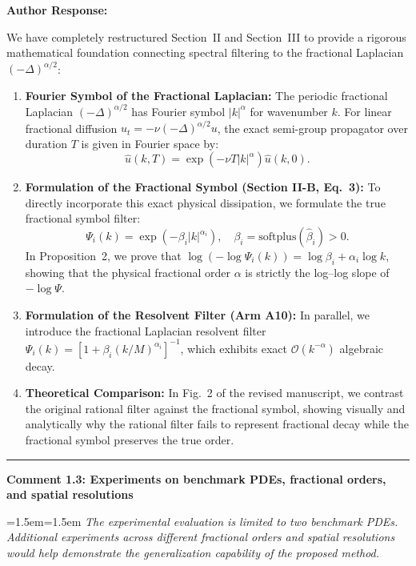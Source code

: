 \documentclass[11pt,a4paper]{article}
\newcommand{\revcomment}[2]{%
  \vspace{3mm}\par\noindent
  \textbf{\color{navyblue}#1}\par\vspace{1.5mm}
  \begingroup
  \leftskip=1.5em\rightskip=1.5em
  \small\itshape\color{commentgray}
  #2\par
  \endgroup
  \vspace{2mm}
}
\newenvironment{authorresponse}{%
  \vspace{1mm}\par\noindent
  \textbf{\color{navyblue}Author Response:}\par\vspace{1.5mm}
}{%
  \vspace{3mm}\par\noindent\rule{\textwidth}{0.3pt}\vspace{2mm}
}
\begin{document}
\begin{authorresponse}
We have completely restructured Section~II and Section~III to provide a rigorous mathematical foundation connecting spectral filtering to the fractional Laplacian $(-\Delta)^{\alpha/2}$:

\begin{enumerate}
  \item \textbf{Fourier Symbol of the Fractional Laplacian:} The periodic fractional Laplacian $(-\Delta)^{\alpha/2}$ has Fourier symbol $|k|^\alpha$ for wavenumber $k$. For linear fractional diffusion $u_t = -\nu (-\Delta)^{\alpha/2} u$, the exact semi-group propagator over duration $T$ is given in Fourier space by:
  \begin{equation}
    \hat{u}(k, T) = \exp(-\nu T |k|^\alpha) \hat{u}(k, 0).
  \end{equation}
  \item \textbf{Formulation of the Fractional Symbol (Section II-B, Eq.~3):} To directly incorporate this exact physical dissipation, we formulate the true fractional symbol filter:
  \begin{equation}
    \Psi_i(k) = \exp(-\beta_i |k|^{\alpha_i}), \quad \beta_i = \text{softplus}(\hat{\beta}_i) > 0.
  \end{equation}
  In Proposition~2, we prove that $\log(-\log \Psi_i(k)) = \log \beta_i + \alpha_i \log k$, showing that the physical fractional order $\alpha$ is strictly the log--log slope of $-\log \Psi$.
  \item \textbf{Formulation of the Resolvent Filter (Arm A10):} In parallel, we introduce the fractional Laplacian resolvent filter $\Psi_i(k) = [1 + \beta_i (k/M)^{\alpha_i}]^{-1}$, which exhibits exact $\mathcal{O}(k^{-\alpha})$ algebraic decay.
  \item \textbf{Theoretical Comparison:} In Fig.~2 of the revised manuscript, we contrast the original rational filter against the fractional symbol, showing visually and analytically why the rational filter fails to represent fractional decay while the fractional symbol preserves the true order.
\end{enumerate}
\end{authorresponse}

\revcomment{Comment 1.3: Experiments on benchmark PDEs, fractional orders, and spatial resolutions}{The experimental evaluation is limited to two benchmark PDEs. Additional experiments across different fractional orders and spatial resolutions would help demonstrate the generalization capability of the proposed method.}
\end{document}

